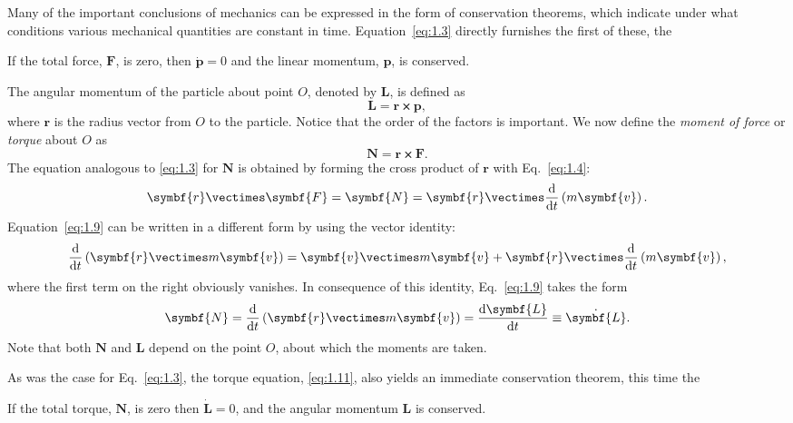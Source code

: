 Many of the important conclusions of mechanics can be expressed in the form of conservation theorems, which indicate under what conditions various mechanical quantities are constant in time. Equation~\eqref{eq:1.3} directly furnishes the first of these, the
\begin{theorem}
    If the total force, \(\symbf{F}\), is zero, then \(\dot{\symbf{p}}=0\) and the linear momentum, \(\symbf{p}\), is conserved.
\end{theorem}

The angular momentum of the particle about point \(O\), denoted by \(\symbf{L}\), is defined as
\begin{equation}
    \symbf{L}=\symbf{r}\vectimes\symbf{p},
\end{equation}
where \(\symbf{r}\) is the radius vector from \(O\) to the particle. Notice that the order of the factors is important. We now define the \emph{moment of force} or \emph{torque} about \(O\) as
\begin{equation}
    \symbf{N}=\symbf{r}\vectimes\symbf{F}.
\end{equation}
The equation analogous to \eqref{eq:1.3} for \(\symbf{N}\) is obtained by forming the cross product of \(\symbf{r}\) with Eq.~\eqref{eq:1.4}:
\begin{equation}
    \symbf{r}\vectimes\symbf{F}=\symbf{N}=\symbf{r}\vectimes\odv*{\left(m\symbf{v}\right)}{t}.\label{eq:1.9}
\end{equation}
Equation~\eqref{eq:1.9} can be written in a different form by using the vector identity:
\begin{equation}
    \odv*{\left(\symbf{r}\vectimes m\symbf{v}\right)}{t}=\symbf{v}\vectimes m\symbf{v}+\symbf{r}\vectimes\odv*{\left(m\symbf{v}\right)}{t},\label{eq:1.10}
\end{equation}
where the first term on the right obviously vanishes. In consequence of this identity, Eq.~\eqref{eq:1.9} takes the form
\begin{equation}
    \symbf{N}=\odv*{\left(\symbf{r}\vectimes m\symbf{v}\right)}{t}=\odv{\symbf{L}}{t}\equiv\dot{\symbf{L}}.\label{eq:1.11}
\end{equation}
Note that both \(\symbf{N}\) and \(\symbf{L}\) depend on the point \(O\), about which the moments are taken.

As was the case for Eq.~\eqref{eq:1.3}, the torque equation, \eqref{eq:1.11}, also yields an immediate conservation theorem, this time the
\begin{theorem}
    If the total torque, \(\symbf{N}\), is zero then \(\dot{\symbf{L}}=0\), and the angular momentum \(\symbf{L}\) is conserved.
\end{theorem}

